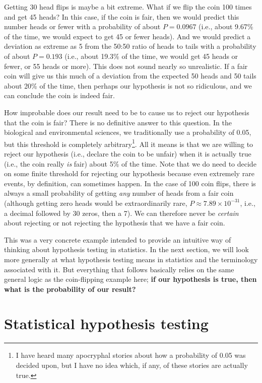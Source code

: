 \documentclass[
]{scrbook}
\begin{document}
Getting 30 head flips is maybe a bit extreme.
What if we flip the coin 100 times and get 45 heads?
In this case, if the coin is fair, then we would predict this number heads or fewer with a probability of about \(P = 0.0967\) (i.e., about 9.67\% of the time, we would expect to get 45 or fewer heads).
And we would predict a deviation as extreme as 5 from the 50:50 ratio of heads to tails with a probability of about \(P = 0.193\) (i.e., about 19.3\% of the time, we would get 45 heads or fewer, or 55 heads or more).
This does not sound nearly so unrealistic.
If a fair coin will give us this much of a deviation from the expected 50 heads and 50 tails about 20\% of the time, then perhaps our hypothesis is not so ridiculous, and we can conclude the coin is indeed fair.

How improbable does our result need to be to cause us to reject our hypothesis that the coin is fair?
There is no definitive answer to this question.
In the biological and environmental sciences, we traditionally use a probability of 0.05, but this threshold is completely arbitrary\footnote{I have heard many apocryphal stories about how a probability of 0.05 was decided upon, but I have no idea which, if any, of these stories are actually true.}.
All it means is that we are willing to reject our hypothesis (i.e., declare the coin to be unfair) when it is actually true (i.e., the coin really \emph{is} fair) about 5\% of the time.
Note that we do need to decide on some finite threshold for rejecting our hypothesis because even extremely rare events, by definition, can sometimes happen.
In the case of 100 coin flips, there is always a small probability of getting \emph{any} number of heads from a fair coin (although getting zero heads would be extraordinarily rare, \(P \approx 7.89 \times 10^{-31}\), i.e., a decimal followed by 30 zeros, then a 7).
We can therefore never be \emph{certain} about rejecting or not rejecting the hypothesis that we have a fair coin.

This was a very concrete example intended to provide an intuitive way of thinking about hypothesis testing in statistics.
In the next section, we will look more generally at what hypothesis testing means in statistics and the terminology associated with it.
But everything that follows basically relies on the same general logic as the coin-flipping example here; \textbf{if our hypothesis is true, then what is the probability of our result?}

\hypertarget{statistical-hypothesis-testing}{%
\section{Statistical hypothesis testing}\label{statistical-hypothesis-testing}}
\end{document}

